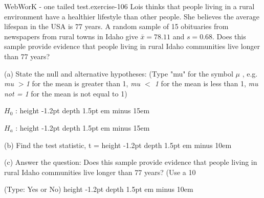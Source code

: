 \documentclass[10pt,]{book}
\newcommand{\fillin}[1]{\leavevmode\leaders\vrule height -1.2pt depth 1.5pt \hskip #1em minus #1em \null}
\numberwithin{equation}{section}
\newcommand{\lt}{<}
\begin{document}
\begin{inlineexercise}{WebWorK - one tailed test.}{exercise-106}%
\hypertarget{p-1513}{}%
Lois thinks that people living in a rural environment have a healthier lifestyle than other people.  She believes the average lifespan in the USA is 77 years. A random sample of 15 obituaries from newspapers from rural towns in Idaho give \(\bar{x} = 78.11\) and \(s = 0.68\).  Does this sample provide evidence that people living in rural Idaho communities live longer than 77 years?%
\par
\hypertarget{p-1514}{}%
(a) State the null and alternative hypotheses:  (Type "mu" for the symbol \(\mu\) , e.g.  \emph{mu \(>\)1} for the mean is greater than 1,  \emph{mu \(\lt \) 1} for the mean is less than 1, \emph{mu not = 1} for the mean is not equal to 1)%
\par
\hypertarget{p-1515}{}%
\(H_0\) :  \fillin{15}%
\par
\hypertarget{p-1516}{}%
\(H_a\) :  \fillin{15}%
\par
\hypertarget{p-1517}{}%
(b) Find the test statistic, t =   \fillin{10}%
\par
\hypertarget{p-1518}{}%
(c) Answer the question: Does this sample provide evidence that people living in rural Idaho communities live longer than 77 years? (Use a 10%
\par
\hypertarget{p-1519}{}%
(Type: Yes or No)  \fillin{10}%
\end{inlineexercise}
%
%
%
\typeout{************************************************}
\typeout{************************************************}
%
\end{document}
